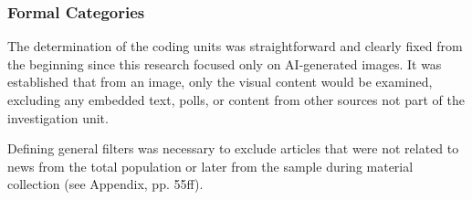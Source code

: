 \subsubsection{Formal Categories}
\label{subsubsec:formal-categories}
The determination of the coding units was straightforward and clearly fixed from the beginning since this research focused only on AI-generated images. It was established that from an image, only the visual content would be examined, excluding any embedded text, polls, or content from other sources not part of the investigation unit.

Defining general filters was necessary to exclude articles that were not related to news from the total population or later from the sample during material collection (see Appendix, pp. 55ff).
